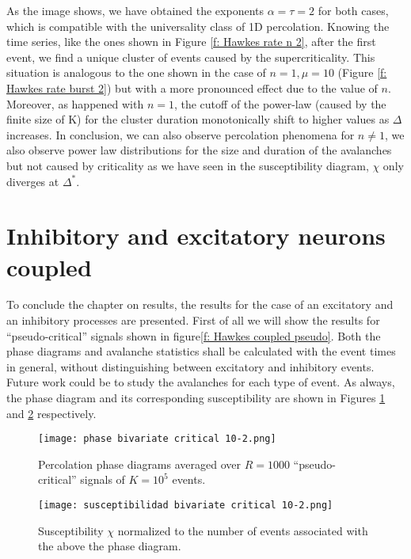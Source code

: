 As the image shows, we have obtained the exponents $\alpha=\tau=2$ for both cases, which is compatible with the universality class of 1D percolation. Knowing the time series, like the ones
shown in Figure \ref{f: Hawkes rate n 2}, after the first event, we find a unique cluster of events caused by the supercriticality. This situation is analogous to the one shown in 
the case of $n=1, \mu=10$ (Figure \ref{f: Hawkes rate burst 2}) but with a more pronounced effect due to the value of $n$. Moreover, as happened with $n=1$, the cutoff of the power-law 
(caused by the finite size of K) for the cluster duration monotonically shift to higher values as $\Delta$ increases.
In conclusion, we can also observe percolation phenomena for 
$n\neq 1$, we also observe power law distributions for the size and duration of the avalanches but not caused by criticality as we have seen in the susceptibility diagram, $\chi$ only diverges
at $\Delta^*$.

\newpage
\section{Inhibitory and excitatory neurons coupled}

To conclude the chapter on results, the results for the case of an excitatory and an inhibitory processes are presented. First of all we will show the results for ``pseudo-critical'' 
signals shown in figure\ref{f: Hawkes coupled pseudo}. Both the phase diagrams and avalanche statistics shall be calculated with the event times in general, without distinguishing
between excitatory and inhibitory events. Future work could be to study the avalanches for each type of event. As always, the phase diagram and its corresponding susceptibility are shown in
Figures \ref{f:phase_diagram_coupled critical} and \ref{f:susceptibilidad_coupled critical} respectively.

\begin{figure}[H]
    \centering
    \texttt{[image: phase bivariate critical 10-2.png]}
    \caption{Percolation phase diagrams averaged over $R=1000$ ``pseudo-critical'' signals of $K=10^5$ events.}
    \label{f:phase_diagram_coupled critical}
\end{figure}

\begin{figure}[H]
    \centering
    \texttt{[image: susceptibilidad bivariate critical 10-2.png]}
    \caption{Susceptibility $\chi$ normalized to the number of events associated with the above the phase diagram.}
    \label{f:susceptibilidad_coupled critical}
\end{figure}

